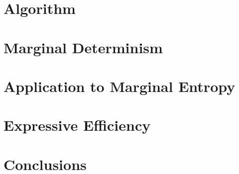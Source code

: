 \documentclass[9pt,fleqn,twoside,twocolumn]{stdglobal}
\begin{document}
\section{Algorithm}

\section{Marginal Determinism}

\section{Application to Marginal Entropy}

\section{Expressive Efficiency}

\section{Conclusions}

\nocite{*}
\printbibliography[heading=bibintoc]
\end{document}
